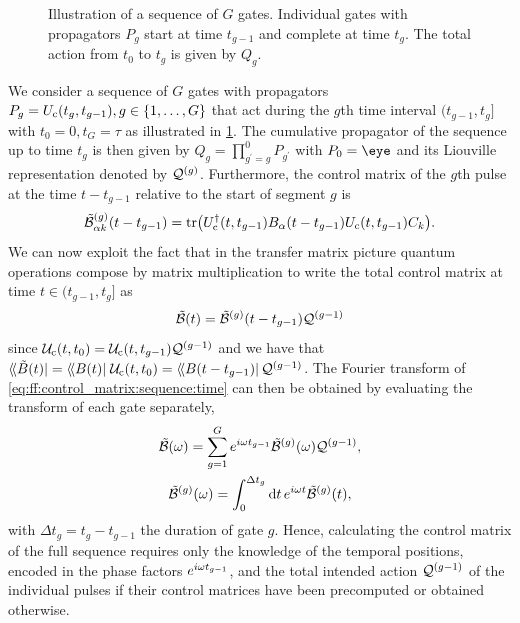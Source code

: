 \begin{figure}
    \centering
    
    \caption[]{
        Illustration of a sequence of $G$ gates.
        Individual gates with propagators $P_g$ start at time $t_{g-1}$ and complete at time $t_g$.
        The total action from $t_0$ to $t_g$ is given by $Q_g$.
    }
    \label{fig:ff:gatesequence}
\end{figure}

We consider a sequence of $G$ gates with propagators $P_g = U_{\mathrm{c}}(t_g, t_{g-1}), g\in\lbrace 1,\dotsc,G\rbrace$ that act during the $g$th time interval $(t_{g-1}, t_g]$ with $t_0 =  0, t_G = \tau$ as illustrated in \cref{fig:ff:gatesequence}.
The cumulative propagator of the sequence up to time $t_g$ is then given by $Q_g = \prod_{g^\prime=g}^0 P_{g^\prime}$ with $P_0 = \eye$ and its Liouville representation denoted by $\mathcal{Q}^{(g)}$.
Furthermore, the control matrix of the $g$th pulse at the time $t - t_{g-1}$ relative to the start of segment $g$ is
\begin{equation}\label{eq:ff:control_matrix:pulse:time}
    \tilde{\mathcal{B}}^{(g)}_{\alpha k}(t - t_{g-1}) = \tr(U_{\mathrm{c}}^\dagger(t, t_{g-1})B_\alpha(t - t_{g-1}) U_{\mathrm{c}}(t, t_{g-1}) C_k).
\end{equation}
We can now exploit the fact that in the transfer matrix picture quantum operations compose by matrix multiplication to write the total control matrix at time $t\in (t_{g-1}, t_g]$ as
\begin{equation}\label{eq:ff:control_matrix:sequence:time}
    \tilde{\mathcal{B}}(t) = \tilde{\mathcal{B}}^{(g)}(t - t_{g-1})\mathcal{Q}^{(g-1)}
\end{equation}
since $\mathcal{U}_{\mathrm{c}}(t, t_0) = \mathcal{U}_{\mathrm{c}}(t, t_{g-1})\mathcal{Q}^{(g-1)}$ and we have that $\dbra*{\tilde{B}(t)} = \dbra{B(t)}\liouvUc(t, t_0) \allowbreak = \dbra*{B(t - t_{g-1})}\liouvQ\gth{g-1}$.
The Fourier transform of \cref{eq:ff:control_matrix:sequence:time} can then be obtained by evaluating the transform of each gate separately,
\begin{gather}
    \tilde{\mathcal{B}}(\omega) = \sum_{g = 1}^G e^{i\omega t_{g-1}}\tilde{\mathcal{B}}^{(g)}(\omega)\mathcal{Q}^{(g-1)} \label{eq:ff:control_matrix:sequence:freq}, \\
    \tilde{\mathcal{B}}^{(g)}(\omega) = \int_0^{\Delta t_g}\dd{t}e^{i\omega t}\tilde{\mathcal{B}}^{(g)}(t), \label{eq:ff:control_matrix:pulse:freq}
\end{gather}
with $\Delta t_g = t_g - t_{g-1}$ the duration of gate $g$.
Hence, calculating the control matrix of the full sequence requires only the knowledge of the temporal positions, encoded in the phase factors $e^{i\omega t_{g-1}}$, and the total intended action $\mathcal{Q}^{(g-1)}$ of the individual pulses if their control matrices have been precomputed or obtained otherwise.
